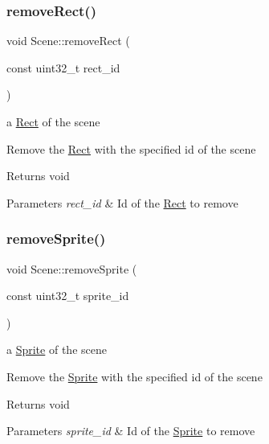 \subsubsection{\texorpdfstring{remove\+Rect()}{removeRect()}}
{\footnotesize\ttfamily void Scene\+::remove\+Rect (\begin{DoxyParamCaption}\item[{const uint32\+\_\+t}]{rect\+\_\+id }\end{DoxyParamCaption})}

a \hyperlink{class_rect}{Rect} of the scene

Remove the \hyperlink{class_rect}{Rect} with the specified id of the scene

\begin{DoxyReturn}{Returns}
void 
\end{DoxyReturn}

\begin{DoxyParams}{Parameters}
{\em rect\+\_\+id} & Id of the \hyperlink{class_rect}{Rect} to remove \\
\hline
\end{DoxyParams}
\mbox{\label{class_scene_a6033b04f27e305069727d210e86b3902}} 
\subsubsection{\texorpdfstring{remove\+Sprite()}{removeSprite()}}
{\footnotesize\ttfamily void Scene\+::remove\+Sprite (\begin{DoxyParamCaption}\item[{const uint32\+\_\+t}]{sprite\+\_\+id }\end{DoxyParamCaption})}

a \hyperlink{class_sprite}{Sprite} of the scene

Remove the \hyperlink{class_sprite}{Sprite} with the specified id of the scene

\begin{DoxyReturn}{Returns}
void 
\end{DoxyReturn}

\begin{DoxyParams}{Parameters}
{\em sprite\+\_\+id} & Id of the \hyperlink{class_sprite}{Sprite} to remove \\
\hline
\end{DoxyParams}
\mbox{\label{class_scene_a6418fa4353c7d079b42e11af7343c8a9}} 
